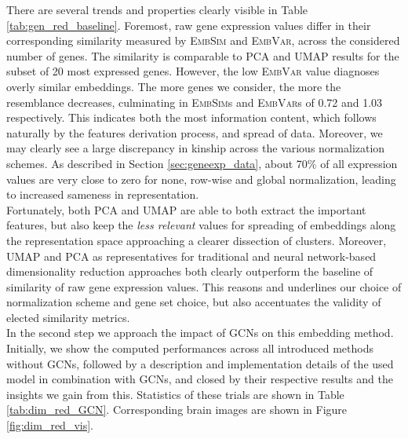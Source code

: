 \documentclass[]{article}
\begin{document}
There are several trends and properties clearly visible in Table \ref{tab:gen_red_baseline}. Foremost, raw gene expression values differ in their corresponding similarity measured by \textsc{EmbSim} and \textsc{EmbVar}, across the considered number of genes. The similarity is comparable to PCA and UMAP results for the subset of 20 most expressed genes. However, the low \textsc{EmbVar} value diagnoses overly similar embeddings. The more genes we consider, the more the resemblance decreases, culminating in \textsc{EmbSim}s and \textsc{EmbVar}s of 0.72 and 1.03 respectively. This indicates both the most information content, which follows naturally by the features derivation process, and spread of data. 
Moreover, we may clearly see a large discrepancy in kinship across the various normalization schemes. As described in Section \ref{sec:geneexp_data}, about 70\% of all expression values are very close to zero for none, row-wise and global normalization, leading to increased sameness in representation. \\

Fortunately, both PCA and UMAP are able to both extract the important features, but also keep the \textit{less relevant} values for spreading of embeddings along the representation space approaching a clearer dissection of clusters. Moreover, UMAP and PCA as representatives for traditional and neural network-based dimensionality reduction approaches both clearly outperform the baseline of similarity of raw gene expression values. 
This reasons and underlines our choice of normalization scheme and gene set choice, but also accentuates the validity of elected similarity metrics.\\

In the second step we approach the impact of GCNs on this embedding method. Initially, we show the computed performances across all introduced methods without GCNs, followed by a description and implementation details of the used model in combination with GCNs, and closed by their respective results and the insights we gain from this. Statistics of these trials are shown in Table \ref{tab:dim_red_GCN}. Corresponding brain images are shown in Figure \ref{fig:dim_red_vis}.\\
\end{document}
